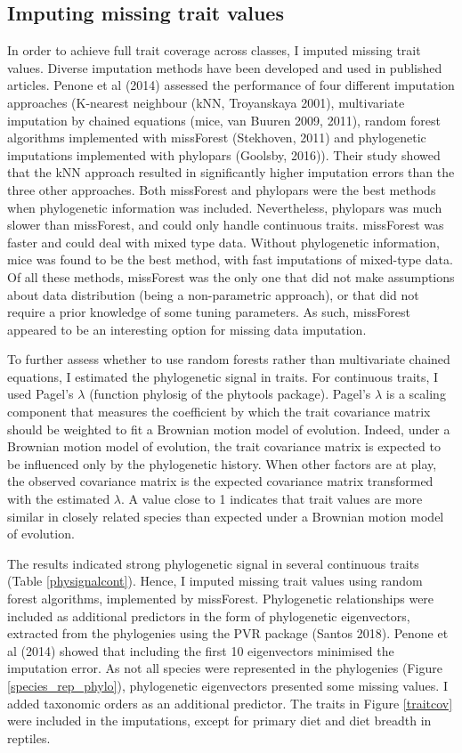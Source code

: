 \subsection{Imputing missing trait values}
In order to achieve full trait coverage across classes, I imputed missing trait values. Diverse imputation methods have been developed and used in published articles. Penone et al (2014) assessed the performance of four different imputation approaches (K-nearest neighbour (kNN, Troyanskaya 2001), multivariate imputation by chained equations (mice, van Buuren 2009, 2011), random forest algorithms implemented with missForest (Stekhoven, 2011) and phylogenetic imputations implemented with phylopars (Goolsby, 2016)). Their study showed that the kNN approach resulted in significantly higher imputation errors than the three other approaches. Both missForest and phylopars were the best methods when phylogenetic information was included. Nevertheless, phylopars was much slower than missForest, and could only handle continuous traits. missForest was faster and could deal with mixed type data. Without phylogenetic information, mice was found to be the best method, with fast imputations of mixed-type data. Of all these methods, missForest was the only one that did not make assumptions about data distribution (being a non-parametric approach), or that did not require a prior knowledge of some tuning parameters. As such, missForest appeared to be an interesting option for missing data imputation. 

To further assess whether to use random forests rather than multivariate chained equations, I estimated the phylogenetic signal in traits. For continuous traits, I used Pagel's $\lambda$ (function phylosig of the phytools package). Pagel's $\lambda$ is a scaling component that measures the coefficient by which the trait covariance matrix should be weighted to fit a Brownian motion model of evolution. Indeed, under a Brownian motion model of evolution, the trait covariance matrix is expected to be influenced only by the phylogenetic history. When other factors are at play, the observed covariance matrix is the expected covariance matrix transformed with the estimated $\lambda$. A value close to 1 indicates that trait values are more similar in closely related species than expected under a Brownian motion model of evolution. 

The results indicated strong phylogenetic signal in several continuous traits (Table \ref{physignalcont}). Hence, I imputed missing trait values using random forest algorithms, implemented by missForest. Phylogenetic relationships were included as additional predictors in the form of phylogenetic eigenvectors, extracted from the phylogenies using the PVR package (Santos 2018). Penone et al (2014) showed that including the first 10 eigenvectors minimised the imputation error. As not all species were represented in the phylogenies (Figure \ref{species_rep_phylo}), phylogenetic eigenvectors presented some missing values. I added taxonomic orders as an additional predictor. The traits in Figure \ref{traitcov} were included in the imputations, except for primary diet and diet breadth in reptiles.

